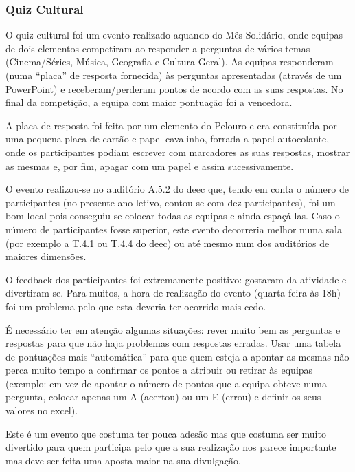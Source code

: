
\subsubsection{Quiz Cultural}

O quiz cultural foi um evento realizado aquando do Mês Solidário, onde equipas de dois elementos competiram ao responder a perguntas de vários temas (Cinema/Séries, Música, Geografia e Cultura Geral). As equipas responderam (numa “placa” de resposta fornecida) às perguntas apresentadas (através de um PowerPoint) e receberam/perderam pontos de acordo com as suas respostas. No final da competição, a equipa com maior pontuação foi a vencedora.

A placa de resposta foi feita por um elemento do Pelouro e era constituída por uma pequena placa de cartão e papel cavalinho, forrada a papel autocolante, onde os participantes podiam escrever com marcadores as suas respostas, mostrar as mesmas e, por fim, apagar com um papel e assim sucessivamente.

O evento realizou-se no auditório A.5.2 do \acrshort{deec} que, tendo em conta o número de participantes (no presente ano letivo, contou-se com dez participantes), foi um bom local pois conseguiu-se colocar todas as equipas e ainda espaçá-las. Caso o número de participantes fosse superior, este evento decorreria melhor numa sala (por exemplo a T.4.1 ou T.4.4 do \acrshort{deec}) ou até mesmo num dos auditórios de maiores dimensões. 

O feedback dos participantes foi extremamente positivo: gostaram da atividade e divertiram-se. Para muitos, a hora de realização do evento (quarta-feira às 18h) foi um problema pelo que esta deveria ter ocorrido mais cedo.

É necessário ter em atenção algumas situações: rever muito bem as perguntas e respostas para que não haja problemas com respostas erradas. Usar uma tabela de pontuações mais “automática” para que quem esteja a apontar as mesmas não perca muito tempo a confirmar os pontos a atribuir ou retirar às equipas (exemplo: em vez de apontar o número de pontos que a equipa obteve numa pergunta, colocar apenas um A (acertou) ou um E (errou) e definir os seus valores no excel).

Este é um evento que costuma ter pouca adesão mas que costuma ser muito divertido para quem participa pelo que a sua realização nos parece importante mas deve ser feita uma aposta maior na sua divulgação.
